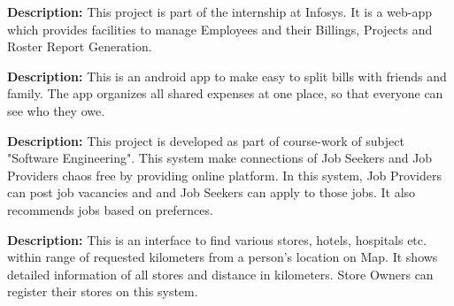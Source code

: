 \documentclass[]{jaydeep-resume-openfont}
\begin{document}
\begin{minipage}[t]{0.70\textwidth}
\textbf{Description:} This project is part of the internship at Infosys. It is a web-app which provides facilities to manage Employees and their Billings, Projects and Roster Report Generation.\\
\sectionsep

\textbf{Description:} This is an android app to make easy to split bills with friends and family. The app organizes all shared expenses at one place, so that everyone can see who they owe.\\
\sectionsep

\textbf{Description:} This project is developed as part of course-work of subject "Software Engineering". This system make connections of Job Seekers and Job Providers chaos free by providing online platform. In this system, Job Providers can post job vacancies and  and Job Seekers can apply to those jobs. It also recommends jobs based on prefernces.
\sectionsep

\textbf{Description:} This is an interface to find various stores, hotels, hospitals etc. within range of requested kilometers from a person's location on Map. It shows detailed information of all stores and distance in kilometers. Store Owners can register their stores on this system.
\sectionsep

\end{minipage}
\end{document}
